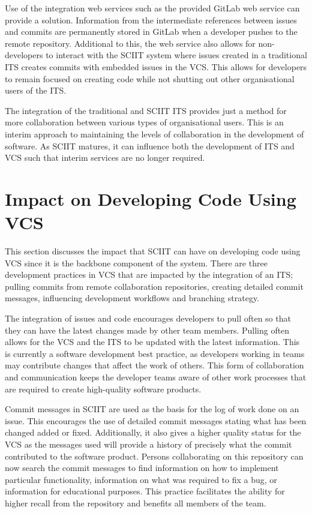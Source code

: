 \documentclass{mproj}
\begin{document}
Use of the integration web services such as the provided GitLab web service can provide a solution. Information from the intermediate references between issues and commits are permanently stored in GitLab when a developer pushes to the remote repository. Additional to this, the web service also allows for non-developers to interact with the SCIIT system where issues created in a traditional ITS creates commits with embedded issues in the VCS. This allows for developers to remain focused on creating code while not shutting out other organisational users of the ITS.

The integration of the traditional and SCIIT ITS provides just a method for more collaboration between various types of organisational users. This is an interim approach to maintaining the levels of collaboration in the development of software. As SCIIT matures, it can influence both the development of ITS and VCS such that interim services are no longer required.

\section{Impact on Developing Code Using VCS}

This section discusses the impact that SCIIT can have on developing code using VCS since it is the backbone component of the system. There are three development practices in VCS that are impacted by the integration of an ITS; pulling commits from remote collaboration repositories, creating detailed commit messages, influencing development workflows and branching strategy.

The integration of issues and code encourages developers to pull often so that they can have the latest changes made by other team members. Pulling often allows for the VCS and the ITS to be updated with the latest information. This is currently a software development best practice, as developers working in teams may contribute changes that affect the work of others. This form of collaboration and communication keeps the developer teams aware of other work processes that are required to create high-quality software products.

Commit messages in SCIIT are used as the basis for the log of work done on an issue. This encourages the use of detailed commit messages stating what has been changed added or fixed. Additionally, it also gives a higher quality status for the VCS as the messages used will provide a history of precisely what the commit contributed to the software product. Persons collaborating on this repository can now search the commit messages to find information on how to implement particular functionality, information on what was required to fix a bug, or information for educational purposes. This practice facilitates the ability for higher recall from the repository and benefits all members of the team.
\end{document}

